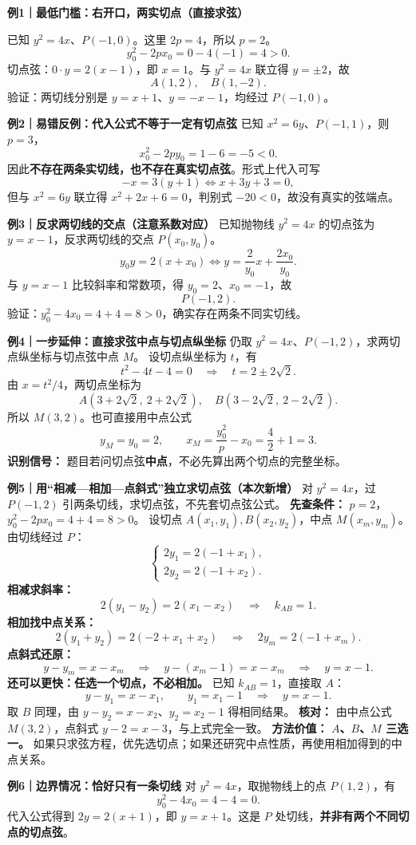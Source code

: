 \begin{examplebox}
\textbf{例1｜最低门槛：右开口，两实切点（直接求弦）}
\par\smallskip\begin{center}\end{center}\par\smallskip

已知 $y^2=4x$、$P(-1,0)$。这里 $2p=4$，所以 $p=2$。
\[
 y_0^2-2px_0=0-4(-1)=4>0.
\]
切点弦：$0\cdot y=2(x-1)$，即 $\boxed{x=1}$。与 $y^2=4x$ 联立得 $y=\pm2$，故
\[A(1,2),\quad B(1,-2).\]
验证：两切线分别是 $y=x+1$、$y=-x-1$，均经过 $P(-1,0)$。

\medskip
\textbf{例2｜易错反例：代入公式不等于一定有切点弦}
已知 $x^2=6y$、$P(-1,1)$，则 $p=3$，
\[x_0^2-2py_0=1-6=-5<0.\]
因此\textbf{不存在两条实切线，也不存在真实切点弦}。形式上代入可写
\[-x=3(y+1)\iff x+3y+3=0,\]
但与 $x^2=6y$ 联立得 $x^2+2x+6=0$，判别式 $-20<0$，故没有真实的弦端点。

\medskip
\textbf{例3｜反求两切线的交点（注意系数对应）}
已知抛物线 $y^2=4x$ 的切点弦为 $y=x-1$，反求两切线的交点 $P(x_0,y_0)$。
\[
 y_0y=2(x+x_0)
 \iff y=\frac{2}{y_0}x+\frac{2x_0}{y_0}.
\]
与 $y=x-1$ 比较斜率和常数项，得 $y_0=2$、$x_0=-1$，故
\[\boxed{P(-1,2)}.\]
验证：$y_0^2-4x_0=4+4=8>0$，确实存在两条不同实切线。

\medskip
\textbf{例4｜一步延伸：直接求弦中点与切点纵坐标}
仍取 $y^2=4x$、$P(-1,2)$，求两切点纵坐标与切点弦中点 $M$。
设切点纵坐标为 $t$，有
\[t^2-4t-4=0\quad\Longrightarrow\quad t=2\pm2\sqrt2.\]
由 $x=t^2/4$，两切点坐标为
\[A(3+2\sqrt2,\ 2+2\sqrt2),\quad
B(3-2\sqrt2,\ 2-2\sqrt2).\]
所以 $\boxed{M(3,2)}$。也可直接用中点公式
\[y_M=y_0=2,\qquad x_M=\frac{y_0^2}{p}-x_0=\frac42+1=3.\]
\textbf{识别信号：} 题目若问切点弦\textbf{中点}，不必先算出两个切点的完整坐标。

\medskip

\textbf{例5｜用“相减—相加—点斜式”独立求切点弦（本次新增）}
对 $y^2=4x$，过 $P(-1,2)$ 引两条切线，求切点弦，不先套切点弦公式。
\textbf{先查条件：} $p=2$，$y_0^2-2px_0=4+4=8>0$。
设切点 $A(x_1,y_1),B(x_2,y_2)$，中点 $M(x_m,y_m)$。由切线经过 $P$：
\[
 \begin{cases}
 2y_1=2(-1+x_1),\\
 2y_2=2(-1+x_2).
 \end{cases}
\]
\textbf{相减求斜率：}
\[
 2(y_1-y_2)=2(x_1-x_2)\quad\Longrightarrow\quad k_{AB}=1.
\]
\textbf{相加找中点关系：}
\[
 2(y_1+y_2)=2(-2+x_1+x_2)
 \quad\Longrightarrow\quad 2y_m=2(-1+x_m).
\]
\textbf{点斜式还原：}
\[
 y-y_m=x-x_m\quad\Longrightarrow\quad
 y-(x_m-1)=x-x_m
 \quad\Longrightarrow\quad\boxed{y=x-1}.
\]
\textbf{还可以更快：任选一个切点，不必相加。} 已知 $k_{AB}=1$，直接取 $A$：
\[
 y-y_1=x-x_1,\qquad y_1=x_1-1
 \quad\Longrightarrow\quad \boxed{y=x-1}.
\]
取 $B$ 同理，由 $y-y_2=x-x_2$、$y_2=x_2-1$ 得相同结果。
\textbf{核对：} 由中点公式 $M(3,2)$，点斜式 $y-2=x-3$，与上式完全一致。
\textbf{方法价值：} \textbf{$A$、$B$、$M$ 三选一。} 如果只求弦方程，优先选切点；如果还研究中点性质，再使用相加得到的中点关系。

\medskip
\textbf{例6｜边界情况：恰好只有一条切线}
对 $y^2=4x$，取抛物线上的点 $P(1,2)$，有
\[y_0^2-4x_0=4-4=0.\]
代入公式得到 $2y=2(x+1)$，即 $\boxed{y=x+1}$。这是 $P$ 处切线，\textbf{并非有两个不同切点的切点弦}。
\end{examplebox}
